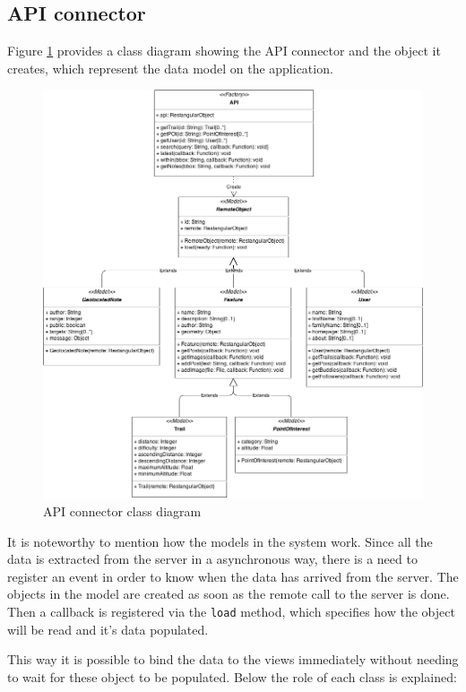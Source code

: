 \FloatBarrier
\subsection{API connector}

Figure \ref{fig:api-component} provides a class diagram showing the API connector and the object it creates, which represent the data model on the application. 

\begin{figure}[ht]
  \centering
  \includegraphics[width=.85\textwidth]{fig/api-component}
  \caption{API connector class diagram}
  \label{fig:api-component}
\end{figure}

It is noteworthy to mention how the models in the system work. Since all the data is extracted from the server in a asynchronous way, there is a need to register an event in order to know when the data has arrived from the server. The objects in the model are created as soon as the remote call to the server is done. Then a callback is registered via the \texttt{load} method, which specifies how the object will be read and it's data populated.

This way it is possible to bind the data to the views immediately without needing to wait for these object to be populated. Below the role of each class is explained:

